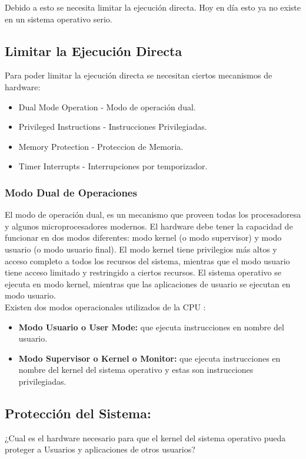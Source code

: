 \documentclass[../main.tex]{subfiles}
\begin{document}
        Debido a esto se necesita limitar la ejecución directa. Hoy en día esto ya no existe en un sistema operativo serio.
	
    \subsection*{Limitar la Ejecución Directa}
        Para poder limitar la ejecución directa se necesitan ciertos mecanismos de hardware:
        \begin{itemize}
            \item Dual Mode Operation - Modo de operación dual.
            \item Privileged Instructions - Instrucciones Privilegiadas.
            \item Memory Protection - Proteccion de Memoria.
            \item Timer Interrupts - Interrupciones por temporizador.
        \end{itemize}
        
        \subsubsection*{Modo Dual de Operaciones}
            El modo de operación dual, es un mecanismo que proveen todas los procesadoresa y algunos microprocesadores modernos. El hardware debe tener la capacidad de funcionar en dos modos diferentes: modo kernel (o modo supervisor) y modo usuario (o modo usuario final). El modo kernel tiene privilegios más altos y acceso completo a todos los recursos del sistema, mientras que el modo usuario tiene acceso limitado y restringido a ciertos recursos. El sistema operativo se ejecuta en modo kernel, mientras que las aplicaciones de usuario se ejecutan en modo usuario.\\

            Existen dos modos operacionales utilizados de la CPU :
            \begin{itemize}
                \item \textbf{Modo Usuario o User Mode:} que ejecuta instrucciones en nombre del usuario.
                \item \textbf{Modo Supervisor o Kernel o Monitor:} que ejecuta instrucciones en nombre del kernel del sistema operativo y estas son instrucciones privilegiadas.
            \end{itemize}
    
    \subsection*{Protección del Sistema:}
        ¿Cual es el hardware necesario para que el kernel del sistema operativo pueda proteger a Usuarios y aplicaciones de otros usuarios?
\end{document}
